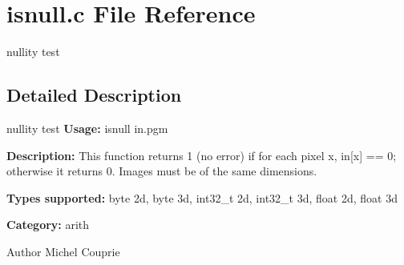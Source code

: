 \section{isnull.c File Reference}
\label{isnull_8c}


nullity test  




\subsection{Detailed Description}
nullity test {\bfseries Usage:} isnull in.pgm

{\bfseries Description:} This function returns 1 (no error) if for each pixel x, in[x] == 0; otherwise it returns 0. Images must be of the same dimensions.

{\bfseries Types supported:} byte 2d, byte 3d, int32\_\-t 2d, int32\_\-t 3d, float 2d, float 3d

{\bfseries Category:} arith

\begin{DoxyAuthor}{Author}
Michel Couprie 
\end{DoxyAuthor}
